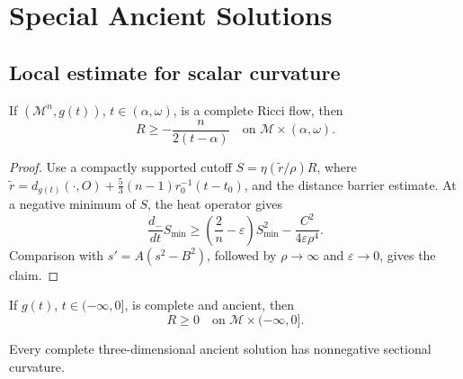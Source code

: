 \chapter[28]{Special Ancient Solutions}
\label{ch:chow-iv-special-ancient-solutions}

\section{Local estimate for scalar curvature}

\begin{theorem}
\label{thm:chow-iv-sharp-lower-scalar}
If \((\mathcal M^n,g(t))\), \(t\in(\alpha,\omega)\), is a complete Ricci
flow, then
\[
 R\ge -\frac{n}{2(t-\alpha)}\quad\text{on }\mathcal M\times(\alpha,\omega).
\]
\end{theorem}
\begin{proof}
\sketch
Use a compactly supported cutoff \(S=\eta(\widetilde r/\rho)R\), where
\(\widetilde r=d_{g(t)}(\mathord\cdot,O)+\frac53(n-1)r_0^{-1}(t-t_0)\),
and the distance barrier estimate.  At a negative minimum of \(S\), the heat
operator gives
\[
 \frac{d_-}{dt}S_{\min}\ge
 \left(\frac2n-\varepsilon\right)S_{\min}^2-
 \frac{C^2}{4\varepsilon\rho^4}.
\]
Comparison with \(s'=A(s^2-B^2)\), followed by \(\rho\to\infty\) and
\(\varepsilon\to0\), gives the claim.
\end{proof}

\begin{corollary}
\label{cor:chow-iv-ancient-nonnegative-scalar}
If \(g(t)\), \(t\in(-\infty,0]\), is complete and ancient, then
\[
R\ge0\quad\text{on }\mathcal M\times(-\infty,0].
\]
\end{corollary}

\begin{theorem}
\label{thm:chow-iv-ancient-3d-sectional}
Every complete three-dimensional ancient solution has nonnegative sectional
curvature.
\end{theorem}


